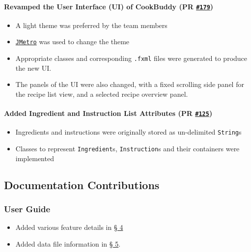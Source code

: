 \documentclass[11pt,british]{article}
\begin{document}
\paragraph{Revamped the User Interface (UI) of CookBuddy (PR \href{https://github.com/AY1920S2-CS2103T-W12-4/main/pull/179}{\texttt{\#179}}) } 
\begin{itemize}
	\item A light theme was preferred by the team members
	\item \href{https://pixelduke.com/java-javafx-theme-jmetro/}{\texttt{JMetro}} was used to change the theme
	\item Appropriate classes and corresponding \texttt{.fxml} files were generated to produce the new UI.
	\item The panels of the UI were also changed, with a fixed scrolling side panel for the recipe list view, and a selected recipe overview panel.
\end{itemize}

\paragraph{Added Ingredient and Instruction List Attributes (PR \href{https://github.com/AY1920S2-CS2103T-W12-4/main/pull/125}{\texttt{\#125}}) }
\begin{itemize}
	\item Ingredients and instructions were originally stored as un-delimited \texttt{String}s
	\item Classes to represent \texttt{Ingredient}s, \texttt{Instruction}s and their containers were implemented
\end{itemize}

\subsection{Documentation Contributions}
\subsubsection{User Guide}
\begin{itemize}
	\item Added various feature details in \href{https://ay1920s2-cs2103t-w12-4.github.io/main/UserGuide.html#features}{\S{} 4}
	\item Added data file information in \href{https://ay1920s2-cs2103t-w12-4.github.io/main/UserGuide.html#configuration-and-recipe-data-sharadh}{\S{} 5}.
\end{itemize}
\end{document}
